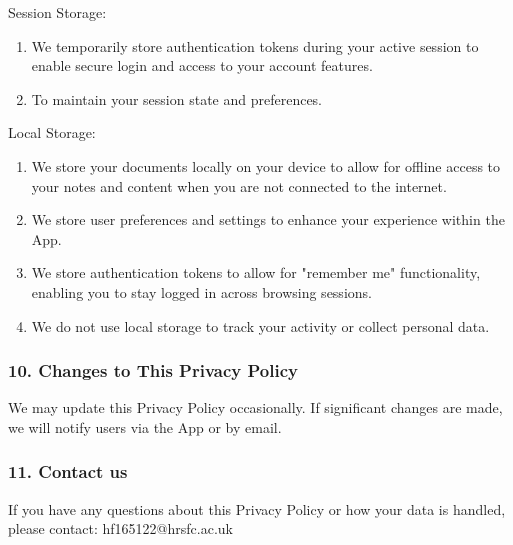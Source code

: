 Session Storage:
\begin{enumerate}
	\item We temporarily store authentication tokens during your active session to enable secure login and access to your account features.
	\item To maintain your session state and preferences.
\end{enumerate}

Local Storage:

\begin{enumerate}
	\item We store your documents locally on your device to allow for offline access to your notes and content when you are not connected to the internet.
	\item We store user preferences and settings to enhance your experience within the App.
	\item We store authentication tokens to allow for "remember me" functionality, enabling you to stay logged in across browsing sessions.
	\item We do not use local storage to track your activity or collect personal data.
\end{enumerate}
\subsubsection*{10. Changes to This Privacy Policy }
We may update this Privacy Policy occasionally. If significant changes are made, we will notify users via the App or by email.
\subsubsection*{11. Contact us}
If you have any questions about this Privacy Policy or how your data is handled, please contact: hf165122@hrsfc.ac.uk


